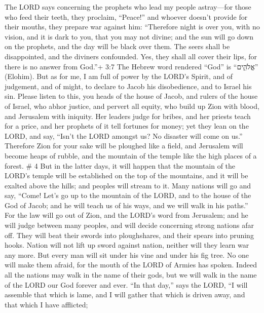  The LORD says concerning the prophets who lead my people
astray---for those who feed their teeth, they proclaim, ``Peace!'' and
whoever doesn't provide for their mouths, they prepare war against him:
 ``Therefore night is over you, with no vision, and it is
dark to you, that you may not divine; and the sun will go down on the
prophets, and the day will be black over them.  The seers
shall be disappointed, and the diviners confounded. Yes, they shall all
cover their lips, for there is no answer from God.''+ 3:7 The Hebrew
word rendered ``God'' is ``אֱלֹהִ֑ים'' (Elohim).  But as for
me, I am full of power by the LORD's Spirit, and of judgement, and of
might, to declare to Jacob his disobedience, and to Israel his sin.
 Please listen to this, you heads of the house of Jacob, and
rulers of the house of Israel, who abhor justice, and pervert all
equity,  who build up Zion with blood, and Jerusalem with
iniquity.  Her leaders judge for bribes, and her priests
teach for a price, and her prophets of it tell fortunes for money; yet
they lean on the LORD, and say, ``Isn't the LORD amongst us? No disaster
will come on us.''  Therefore Zion for your sake will be
ploughed like a field, and Jerusalem will become heaps of rubble, and
the mountain of the temple like the high places of a forest. \# 4
 But in the latter days, it will happen that the mountain of
the LORD's temple will be established on the top of the mountains, and
it will be exalted above the hills; and peoples will stream to it.
 Many nations will go and say, ``Come! Let's go up to the
mountain of the LORD, and to the house of the God of Jacob; and he will
teach us of his ways, and we will walk in his paths.'' For the law will
go out of Zion, and the LORD's word from Jerusalem;  and he
will judge between many peoples, and will decide concerning strong
nations afar off. They will beat their swords into ploughshares, and
their spears into pruning hooks. Nation will not lift up sword against
nation, neither will they learn war any more.  But every man
will sit under his vine and under his fig tree. No one will make them
afraid, for the mouth of the LORD of Armies has spoken. 
Indeed all the nations may walk in the name of their gods, but we will
walk in the name of the LORD our God forever and ever.  ``In
that day,'' says the LORD, ``I will assemble that which is lame, and I
will gather that which is driven away, and that which I have afflicted;
